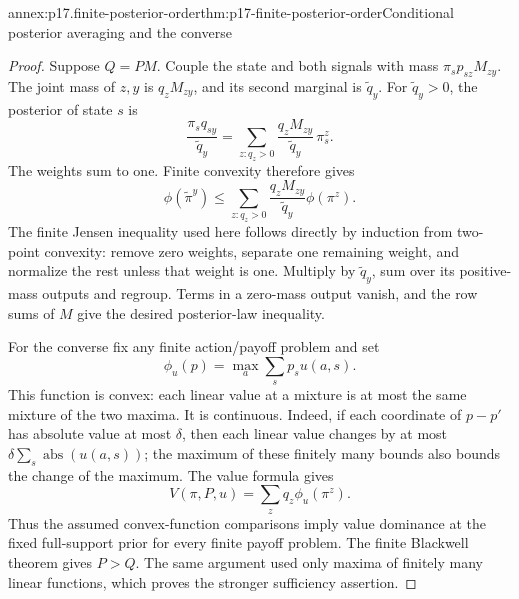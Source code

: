\begin{annexitem}{annex:p17.finite-posterior-order}{thm:p17-finite-posterior-order}{Conditional posterior averaging and the converse}
\begin{proof}
Suppose \(Q=PM\). Couple the state and both signals with mass
\(\pi_s p_{sz}M_{zy}\). The joint mass of \(z,y\) is \(q_zM_{zy}\),
and its second marginal is \(\widetilde q_y\).
For \(\widetilde q_y>0\), the posterior of state \(s\) is
\[
 \frac{\pi_s q_{sy}}{\widetilde q_y}
 =\sum_{z:q_z>0}\frac{q_zM_{zy}}{\widetilde q_y}\,\pi_s^z.
\]
The weights sum to one. Finite convexity therefore gives
\[
 \phi(\widetilde\pi^y)
 \leq\sum_{z:q_z>0}\frac{q_zM_{zy}}{\widetilde q_y}\phi(\pi^z).
\]
The finite Jensen inequality used here follows directly by induction
from two-point convexity: remove zero weights, separate one remaining
weight, and normalize the rest unless that weight is one.
Multiply by \(\widetilde q_y\), sum over its positive-mass outputs
and regroup. Terms in a zero-mass output vanish, and the row sums
of \(M\) give the desired posterior-law inequality.

For the converse fix any finite action/payoff problem and set
\[
                        \phi_u(p)=\max_a\sum_s p_su(a,s).
\]
This function is convex: each linear value at a mixture is at most
the same mixture of the two maxima. It is continuous. Indeed, if
each coordinate of \(p-p'\) has absolute value at most \(\delta\),
then each linear value changes by at most
\(\delta\sum_s\operatorname{abs}(u(a,s))\); the maximum of these
finitely many bounds also bounds the change of the maximum.
The value formula gives
\[
              V(\pi,P,u)=\sum_zq_z\phi_u(\pi^z).
\]
Thus the assumed convex-function comparisons imply value dominance
at the fixed full-support prior for every finite payoff problem.
The finite Blackwell theorem gives \(P>Q\).
The same argument used only maxima of finitely many linear functions,
which proves the stronger sufficiency assertion.
\end{proof}
\end{annexitem}

